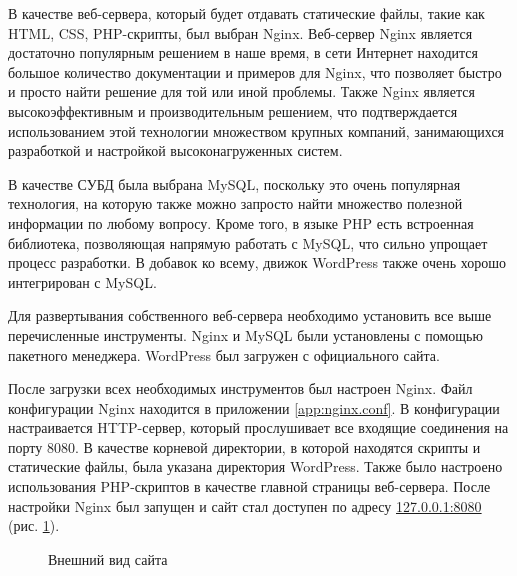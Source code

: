 \documentclass[a4paper, 14pt]{extarticle}
\begin{document}
В качестве веб-сервера, который будет отдавать статические файлы, такие как
HTML, CSS, PHP-скрипты, был выбран Nginx. Веб-сервер Nginx является достаточно
популярным решением в наше время, в сети Интернет находится большое количество
документации и примеров для Nginx, что позволяет быстро и просто найти решение
для той или иной проблемы. Также Nginx является высокоэффективным и
производительным решением, что подтверждается использованием этой технологии
множеством крупных компаний, занимающихся разработкой и настройкой
высоконагруженных систем.

В качестве СУБД была выбрана MySQL, поскольку это очень популярная технология,
на которую также можно запросто найти множество полезной информации по любому
вопросу. Кроме того, в языке PHP есть встроенная библиотека, позволяющая
напрямую работать с MySQL, что сильно упрощает процесс разработки. В добавок ко
всему, движок WordPress также очень хорошо интегрирован с MySQL.

Для развертывания собственного веб-сервера необходимо установить все выше
перечисленные инструменты. Nginx и MySQL были установлены с помощью пакетного
менеджера. WordPress был загружен с официального сайта.

После загрузки всех необходимых инструментов был настроен Nginx. Файл
конфигурации Nginx находится в приложении \ref{app:nginx.conf}. В конфигурации
настраивается HTTP-сервер, который прослушивает все входящие соединения на порту
8080. В качестве корневой директории, в которой находятся скрипты и статические
файлы, была указана директория WordPress. Также было настроено использования
PHP-скриптов в качестве главной страницы веб-сервера. После настройки Nginx был
запущен и сайт стал доступен по адресу \url{127.0.0.1:8080} (рис.
\ref{fig:wordpress-before-hosts}).

\begin{figure}[H]
  \centering
  \caption{Внешний вид сайта}
  \label{fig:wordpress-before-hosts}
\end{figure}
\end{document}
